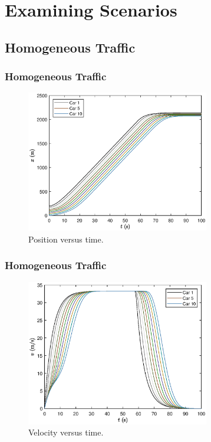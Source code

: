 \documentclass{beamer}
\begin{document}
\section{Examining Scenarios}

\subsection{Homogeneous Traffic}

\begin{frame}
  \frametitle{Homogeneous Traffic}
  \begin{figure}[H]
    \includegraphics[width=8cm]{HomogeneousTraffic1.eps}
    \caption{Position versus time.} 
\end{figure}
\end{frame}

\begin{frame}
  \frametitle{Homogeneous Traffic}
  \begin{figure}[H]
    \includegraphics[width=8cm]{HomogeneousTraffic2.eps}
    \caption{Velocity versus time.}
\end{figure}
\end{frame}
\end{document}
